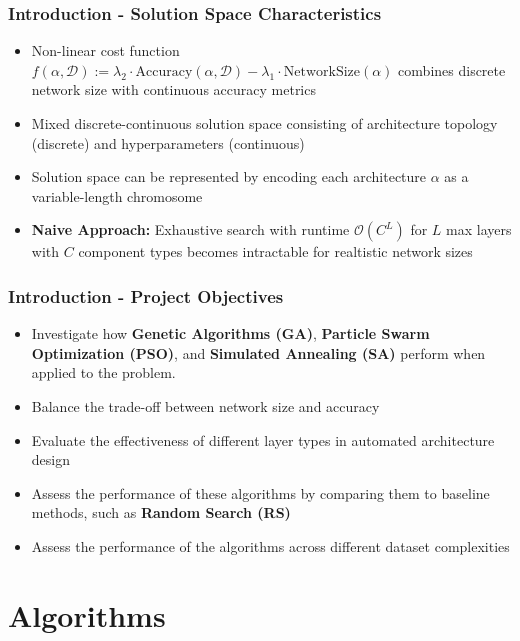 \documentclass{beamer}
\begin{document}
    \begin{frame}
        \frametitle{Introduction - Solution Space Characteristics}
        \begin{itemize}
            \item Non-linear cost function $f\left(\alpha, \mathcal{D}\right) := \lambda_2 \cdot \text{Accuracy}(\alpha, \mathcal{D}) - \lambda_1 \cdot \text{NetworkSize}(\alpha)$ combines discrete network size with continuous accuracy metrics
            \item Mixed discrete-continuous solution space consisting of architecture topology (discrete) and hyperparameters (continuous)
            \item Solution space can be represented by encoding each architecture $\alpha$ as a variable-length chromosome
            \item \textbf{Naive Approach:} Exhaustive search with runtime $\mathcal{O}(C^L)$ for $L$ max layers with $C$ component types becomes intractable for realtistic network sizes
        \end{itemize}
    \end{frame}

    \begin{frame}
        \frametitle{Introduction - Project Objectives}
        \begin{itemize}
            \item Investigate how \textbf{Genetic Algorithms (GA)}, \textbf{Particle Swarm Optimization (PSO)}, and \textbf{Simulated Annealing (SA)} perform when applied to the problem.
            \item Balance the trade-off between network size and accuracy
            \item Evaluate the effectiveness of different layer types in automated architecture design
            \item Assess the performance of these algorithms by comparing them to baseline methods, such as \textbf{Random Search (RS)}
            \item Assess the performance of the algorithms across different dataset complexities
        \end{itemize}
    \end{frame}

    \section{Algorithms}
\end{document}
